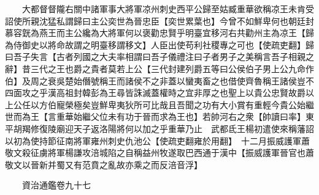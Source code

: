 　　大都督督隴右關中諸軍事大將軍凉州刺史西平公歸至姑臧重華欲稱凉王未肯受詔使所親沈猛私謂歸曰主公奕世為晉忠臣【奕世累葉也】今曾不如鮮卑何也朝廷封慕容皝為燕王而主公纔為大將軍何以褒勸忠賢乎明臺宜移河右共勸州主為凉王【歸為侍御史以將命故謂之明臺移謂移文】人臣出使苟利社稷專之可也【使疏吏翻】歸曰吾子失言【古者列國之大夫率相謂曰吾子儀禮注曰子者男子之美稱言吾子相親之辭】昔三代之王也爵之貴者莫若上公【三代封建列爵五等曰公侯伯子男上公九命作伯】及周之衰吳楚始僭號稱王而諸侯不之非蓋以蠻夷畜之也借使齊魯稱王諸侯豈不四面攻之乎漢高祖封韓彭為王尋皆誅滅蓋權時之宜非厚之也聖上以貴公忠賢故爵以上公任以方伯寵榮極矣豈鮮卑夷狄所可比哉且吾聞之功有大小賞有重輕今貴公始繼世而為王【言重華始繼父位未有功于晉而求為王也】若帥河右之衆【帥讀曰率】東平胡羯修復陵廟迎天子返洛陽將何以加之乎重華乃止　武都氐王楊初遣使來稱藩詔以初為使持節征南將軍雍州刺史仇池公【使疏吏翻雍於用翻】　十二月振威護軍蕭敬文殺征虜將軍楊謙攻涪城陷之自稱益州牧遂取巴西通于漢中【振威護軍晉官也蕭敬文以晉新并蜀又有范賁之亂故亦乘之而反涪音浮】

　　資治通鑑卷九十七


    


 


 



 

 
  







 


　　
　　
　
　
　


　　

　















	
	









































